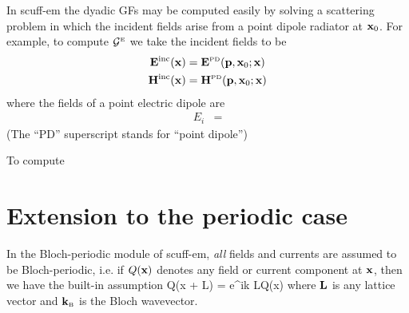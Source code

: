 \documentclass[letterpaper]{article}
\begin{document}
In {\sc scuff-em} the dyadic GFs may be computed easily by solving a
scattering problem in which the incident fields arise from a point dipole
radiator at $\mathbf{x}_0$. For example, to compute $\mathcal{G}^{\hbox{\tiny{E}}}$ we 
take the incident fields to be
\begin{align*}
 \mathbf{E}^{\hbox{\scriptsize{inc}}}(\mathbf{x}) &= \mathbf{E}^{\hbox{\tiny{PD}}}(\mathbf{p}, \mathbf{x}_0; \mathbf{x})
\\
 \mathbf{H}^{\hbox{\scriptsize{inc}}}(\mathbf{x}) &= \mathbf{H}^{\hbox{\tiny{PD}}}(\mathbf{p}, \mathbf{x}_0; \mathbf{x})
\end{align*}
where the fields of a point electric dipole are
\begin{subequations}
\begin{align*}
 E_i&=
\end{align*}
\label{PDFields}
\end{subequations}
(The ``PD'' superscript stands for ``point dipole'')

To compute

\newpage
\section{Extension to the periodic case}

In the Bloch-periodic module of {\sc scuff-em}, \textit{all}
fields and currents are assumed to be Bloch-periodic, i.e.
if $Q(\mathbf{x})$ denotes any field or current component at $\mathbf{x}$,
then we have the built-in assumption
{Q(\vb x + \vb L) = e^{i\vb k \cdot \vb L}Q(\vb x)}
where $\mathbf{L}$ is any lattice vector and 
$\mathbf{k}_{\hbox{\tiny{B}}}$ is the Bloch wavevector.
\end{document}
